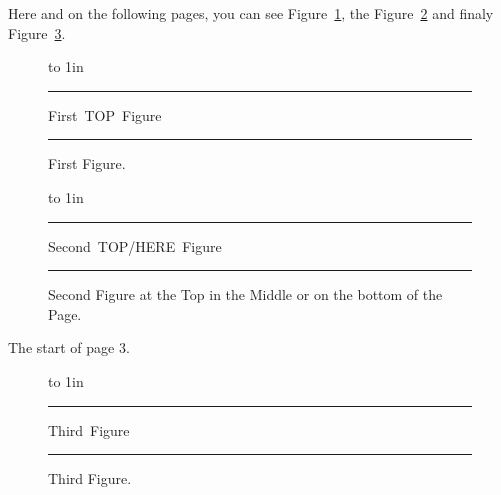 \documentclass[10pt]{article}
\begin{document}
\listoffigures


\newpage
Here and on the following pages, you can see Figure~\ref{firstfig},
the Figure~\ref{secondfig} and finaly Figure~\ref{lastfig}.

\begin{figure}[h]
  \vbox to 1in {\hrule
    \vfill
    \hbox{First TOP Figure}
    \vfill
    \hrule}
  \caption{First Figure.}
  \label{firstfig}
\end{figure}
\begin{figure}[h]
  \vbox to 1in {\hrule
    \vfill
    \hbox{Second TOP/HERE Figure}
    \vfill
    \hrule}
  \caption{Second Figure at the Top in the Middle or on the bottom of the Page.}
  \label{secondfig}
\end{figure}

\newpage
The start of page 3.

\begin{figure}[h]
  \vbox to 1in {\hrule
    \vfill
    \hbox{Third Figure}
    \vfill
    \hrule}
  \caption{Third Figure.}
  \label{lastfig}
\end{figure}
\vfill
\end{document}
